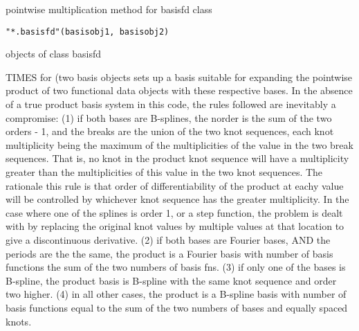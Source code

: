 \documentclass{article}
\begin{document}
\begin{Description}\relax
pointwise multiplication method for basisfd class
\end{Description}
\begin{Usage}
\begin{verbatim}
"*.basisfd"(basisobj1, basisobj2)
\end{verbatim}
\end{Usage}
\begin{Arguments}
\begin{ldescription}
\item[\code{basisobj1, basisobj2}] objects of class basisfd 

\end{ldescription}
\end{Arguments}
\begin{Details}\relax
TIMES for (two basis objects sets up a basis suitable for expanding
the pointwise product of two functional data objects with these
respective bases.  In the absence of a true product basis system in
this code, the rules followed are inevitably a compromise:
(1) if both bases are B-splines, the norder is the sum of the
two orders - 1, and the breaks are the union of the
two knot sequences, each knot multiplicity being the maximum
of the multiplicities of the value in the two break sequences.
That is, no knot in the product knot sequence will have a
multiplicity greater than the multiplicities of this value
in the two knot sequences.  
The rationale this rule is that order of differentiability
of the product at eachy value will be controlled  by
whichever knot sequence has the greater multiplicity.  
In the case where one of the splines is order 1, or a step
function, the problem is dealt with by replacing the
original knot values by multiple values at that location
to give a discontinuous derivative.
(2) if both bases are Fourier bases, AND the periods are the 
the same, the product is a Fourier basis with number of
basis functions the sum of the two numbers of basis fns.
(3) if only one of the bases is B-spline, the product basis
is B-spline with the same knot sequence and order two
higher.
(4) in all other cases, the product is a B-spline basis with
number of basis functions equal to the sum of the two
numbers of bases and equally spaced knots.
\end{Details}
\begin{SeeAlso}\relax
{}
\end{SeeAlso}
\end{document}
